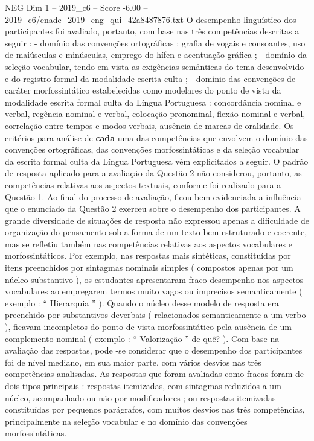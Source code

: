 \begin{textsample}{NEG Dim 1 – 2019\_c6 – Score -6.00 – 2019\_c6/enade\_2019\_eng\_qui\_42a8487876.txt}
O desempenho linguístico dos participantes foi avaliado, portanto, com base nas três competências descritas a seguir : - domínio das convenções ortográficas : grafia de vogais e consoantes, uso de maiúsculas e minúsculas, emprego do hífen e acentuação gráfica ; - domínio da seleção vocabular, tendo em vista as exigências semânticas do tema desenvolvido e do registro formal da modalidade escrita culta ; - domínio das convenções de caráter morfossintático estabelecidas como modelares do ponto de vista da modalidade escrita formal culta da Língua Portuguesa : concordância nominal e verbal, regência nominal e verbal, colocação pronominal, flexão nominal e verbal, correlação entre tempos e modos verbais, ausência de marcas de oralidade.
Os critérios para análise de \textbf{cada} uma das competências que envolvem o domínio das convenções ortográficas, das convenções morfossintáticas e da seleção vocabular da escrita formal culta da Língua Portuguesa vêm explicitados a seguir.
O padrão de resposta aplicado para a avaliação da Questão 2 não considerou, portanto, as competências relativas aos aspectos textuais, conforme foi realizado para a Questão 1.
Ao final do processo de avaliação, ficou bem evidenciada a influência que o enunciado da Questão 2 exerceu sobre o desempenho dos participantes.
A grande diversidade de situações de resposta não expressou apenas a dificuldade de organização do pensamento sob a forma de um texto bem estruturado e coerente, mas se refletiu também nas competências relativas aos aspectos vocabulares e morfossintáticos.
Por exemplo, nas respostas mais sintéticas, constituídas por itens preenchidos por sintagmas nominais simples ( compostos apenas por um núcleo substantivo ), os estudantes apresentaram fraco desempenho nos aspectos vocabulares ao empregarem termos muito vagos ou imprecisos semanticamente ( exemplo : “ Hierarquia ” ).
Quando o núcleo desse modelo de resposta era preenchido por substantivos deverbais ( relacionados semanticamente a um verbo ), ficavam incompletos do ponto de vista morfossintático pela ausência de um complemento nominal ( exemplo : “ Valorização ” de quê? ).
Com base na avaliação das respostas, pode -se considerar que o desempenho dos participantes foi de nível mediano, em sua maior parte, com vários desvios nas três competências analisadas.
As respostas que foram avaliadas como fracas foram de dois tipos principais : respostas itemizadas, com sintagmas reduzidos a um núcleo, acompanhado ou não por modificadores ; ou respostas itemizadas constituídas por pequenos parágrafos, com muitos desvios nas três competências, principalmente na seleção vocabular e no domínio das convenções morfossintáticas.

\end{textsample}
